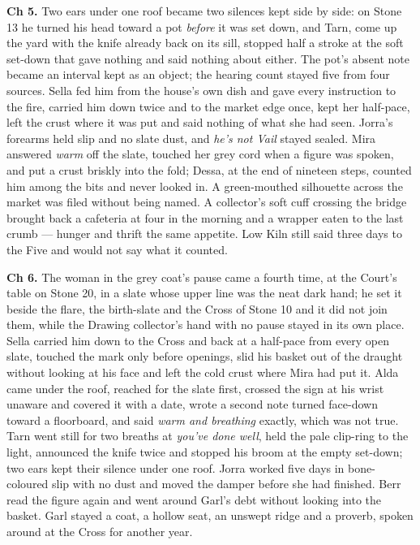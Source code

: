 \documentclass{design/chronicle}
\begin{document}
{\textbf{Ch 5.} Two ears under one roof became two silences kept side by side: on Stone 13 he turned his head toward a pot \emph{before} it was set down, and Tarn, come up the yard with the knife already back on its sill, stopped half a stroke at the soft set-down that gave nothing and said nothing about either. The pot’s absent note became an interval kept as an object; the hearing count stayed five from four sources. Sella fed him from the house’s own dish and gave every instruction to the fire, carried him down twice and to the market edge once, kept her half-pace, left the crust where it was put and said nothing of what she had seen. Jorra’s forearms held slip and no slate dust, and \emph{he’s not Vail} stayed sealed. Mira answered \emph{warm} off the slate, touched her grey cord when a figure was spoken, and put a crust briskly into the fold; Dessa, at the end of nineteen steps, counted him among the bits and never looked in. A green-mouthed silhouette across the market was filed without being named. A collector’s soft cuff crossing the bridge brought back a cafeteria at four in the morning and a wrapper eaten to the last crumb --- hunger and thrift the same appetite. Low Kiln still said three days to the Five and would not say what it counted.

\textbf{Ch 6.} The woman in the grey coat’s pause came a fourth time, at the Court’s table on Stone 20, in a slate whose upper line was the neat dark hand; he set it beside the flare, the birth-slate and the Cross of Stone 10 and it did not join them, while the Drawing collector’s hand with no pause stayed in its own place. Sella carried him down to the Cross and back at a half-pace from every open slate, touched the mark only before openings, slid his basket out of the draught without looking at his face and left the cold crust where Mira had put it. Alda came under the roof, reached for the slate first, crossed the sign at his wrist unaware and covered it with a date, wrote a second note turned face-down toward a floorboard, and said \emph{warm and breathing} exactly, which was not true. Tarn went still for two breaths at \emph{you’ve done well}, held the pale clip-ring to the light, announced the knife twice and stopped his broom at the empty set-down; two ears kept their silence under one roof. Jorra worked five days in bone-coloured slip with no dust and moved the damper before she had finished. Berr read the figure again and went around Garl’s debt without looking into the basket. Garl stayed a coat, a hollow seat, an unswept ridge and a proverb, spoken around at the Cross for another year.

}
\end{document}
